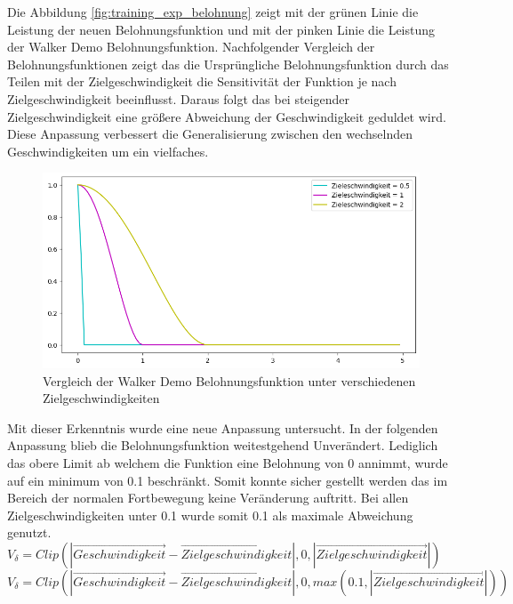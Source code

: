 Die Abbildung \ref{fig:training_exp_belohnung} zeigt mit der grünen Linie die Leistung der neuen Belohnungsfunktion und mit der pinken Linie die Leistung der Walker Demo Belohnungsfunktion. Nachfolgender Vergleich der Belohnungsfunktionen zeigt das die Ursprüngliche Belohnungsfunktion durch das Teilen mit der Zielgeschwindigkeit die Sensitivität der Funktion je nach Zielgeschwindigkeit beeinflusst. Daraus folgt das bei steigender Zielgeschwindigkeit eine größere Abweichung der Geschwindigkeit geduldet wird. Diese Anpassung verbessert die Generalisierung zwischen den wechselnden Geschwindigkeiten um ein vielfaches.

\begin{figure}[H]
  \centering  
  \includegraphics[scale=0.5]{img/match_velocity_original_vergleich.png}
  \caption{Vergleich der Walker Demo Belohnungsfunktion unter verschiedenen Zielgeschwindigkeiten}
  \label{fig:match_velocity_original_vergleich}
\end{figure}

Mit dieser Erkenntnis wurde eine neue Anpassung untersucht. In der folgenden Anpassung blieb die Belohnungsfunktion weitestgehend Unverändert. Lediglich das obere Limit ab welchem die Funktion eine Belohnung von 0 annimmt, wurde auf ein minimum von 0.1 beschränkt. Somit konnte sicher gestellt werden das im Bereich der normalen Fortbewegung keine Veränderung auftritt. Bei allen Zielgeschwindigkeiten unter 0.1 wurde somit 0.1 als maximale Abweichung genutzt.\\
$V_\delta=Clip(|\vec{Geschwindigkeit} - \vec{Zielgeschwindigkeit}|, 0, |\vec{Zielgeschwindigkeit}|)$ \\
$V_\delta=Clip(|\vec{Geschwindigkeit} - \vec{Zielgeschwindigkeit}|, 0, max(0.1, |\vec{Zielgeschwindigkeit}|))$ \\



